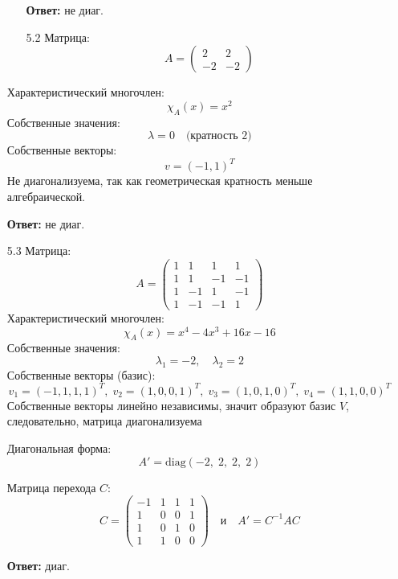 \documentclass[a4paper]{article}
\begin{document}
\begin{enumerate}
\begin{enumerate}
      \textbf{Ответ: } не диаг.\\

      \item[5.2]Матрица:
      \[
      A =
      \begin{pmatrix}
      2 & 2\\
      -2 & -2
      \end{pmatrix}
      \]
    \end{enumerate}

    Характеристический многочлен:
    \[
    \chi_A(x) = x^2
    \]
    Собственные значения:
    \[
    \lambda = 0\quad\text{(кратность 2)}
    \]
    Собственные векторы:
    \[v = (-1, 1)^T\]
    Не диагонализуема, так как геометрическая кратность меньше алгебраической.
    
    \textbf{Ответ: } не диаг.\\

    \item[5.3]Матрица:
    \[
    A = 
    \begin{pmatrix}
    1 & 1 & 1 & 1\\
    1 & 1 & -1 & -1\\
    1 & -1 & 1 & -1\\
    1 & -1 & -1 & 1
    \end{pmatrix}
    \]
    Характеристический многочлен:
    \[
    \chi_A(x) = x^4 - 4x^3 + 16x - 16
    \]
    Собственные значения:
    \[
    \lambda_1 = -2,\quad \lambda_2 = 2
    \]
    Собственные векторы (базис):
    \[
    v_1 = (-1,1,1,1)^T,\;
    v_2 = (1,0,0,1)^T,\;
    v_3 = (1,0,1,0)^T,\;
    v_4 = (1,1,0,0)^T
    \]
    Собственные векторы линейно независимы, значит образуют базис $V$, следовательно, матрица диагонализуема  
    
    Диагональная форма:
    \[
    A' = \mathrm{diag}(-2,\;2,\;2,\;2)
    \]

    Матрица перехода \(C\):
    \[
    C = \begin{pmatrix}
    -1 & 1 & 1 & 1\\
    1  & 0 & 0 & 1\\
    1  & 0 & 1 & 0\\
    1  & 1 & 0 & 0
    \end{pmatrix}
    \quad\text{и}\quad
    A' = C^{-1}AC
    \]

    \textbf{Ответ: } диаг.\\


\end{enumerate}
\end{document}
